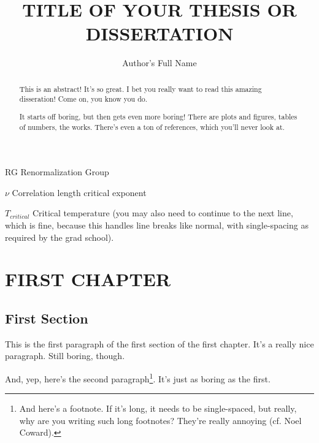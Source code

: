 \documentclass[openany]{book}
\title{TITLE OF YOUR THESIS OR DISSERTATION}
\author{Author's Full Name}
\begin{document}
\frontmatter

\maketitlepage

\makecopyrightpage

\begin{abstract}
        This is an abstract!
        It's so great.
        I bet you really want to read this amazing disseration!
        Come on, you know you do.

        It starts off boring, but then gets even more boring!
        There are plots and figures, tables of numbers, the works.
        There's even a ton of references, which you'll never look at.
\end{abstract}

\maketableofcontents

\maketablelist

\makefigurelist

\begin{AbbrevList}
        \item[RG] Renormalization Group
        \item[$\nu$] Correlation length critical exponent
        \item[$T_{critical}$] Critical temperature (you may also need
                to continue to the next line, which is fine, because
                this handles line breaks like normal, with single-spacing
                as required by the grad school).
\end{AbbrevList}

\mainmatter

\chapter{FIRST CHAPTER}
\section{First Section}
        This is the first paragraph of the first section of the first chapter.
        It's a really nice paragraph.
        Still boring, though.

        And, yep, here's the second paragraph\footnote{
                And here's a footnote. If it's long, it needs to be single-spaced,
                but really, why are you writing such long footnotes?
                They're really annoying (cf. Noel Coward).
        }.
        It's just as boring as the first.
\end{document}
